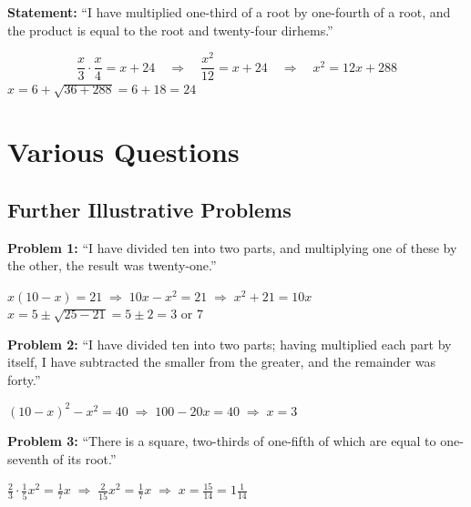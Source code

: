 \documentclass[11pt,a4paper]{book}
\begin{document}
\textbf{Statement:} ``I have multiplied one-third of a root by one-fourth of
a root, and the product is equal to the root and twenty-four dirhems.''

\begin{mathbox}
\begin{equation}
\frac{x}{3} \cdot \frac{x}{4} = x + 24 \quad\Rightarrow\quad \frac{x^2}{12} = x + 24
\quad\Rightarrow\quad x^2 = 12x + 288
\end{equation}
$x = 6 + \sqrt{36 + 288} = 6 + 18 = 24$
\end{mathbox}

\newpage

\chapter{Various Questions}
\label{ch:various}

\section*{Further Illustrative Problems}

\textbf{Problem 1:} ``I have divided ten into two parts, and multiplying one
of these by the other, the result was twenty-one.''

\begin{mathbox}
$x(10-x) = 21 \;\Rightarrow\; 10x - x^2 = 21 \;\Rightarrow\; x^2 + 21 = 10x$
$x = 5 \pm \sqrt{25 - 21} = 5 \pm 2 = 3 \text{ or } 7$
\end{mathbox}

\textbf{Problem 2:} ``I have divided ten into two parts; having multiplied
each part by itself, I have subtracted the smaller from the greater, and the
remainder was forty.''

\begin{mathbox}
$(10-x)^2 - x^2 = 40 \;\Rightarrow\; 100 - 20x = 40 \;\Rightarrow\; x = 3$
\end{mathbox}

\textbf{Problem 3:} ``There is a square, two-thirds of one-fifth of which are
equal to one-seventh of its root.''

\begin{mathbox}
$\tfrac{2}{3} \cdot \tfrac{1}{5} x^2 = \tfrac{1}{7}x \;\Rightarrow\; \tfrac{2}{15}x^2 = \tfrac{1}{7}x
\;\Rightarrow\; x = \tfrac{15}{14} = 1\tfrac{1}{14}$
\end{mathbox}
\end{document}
